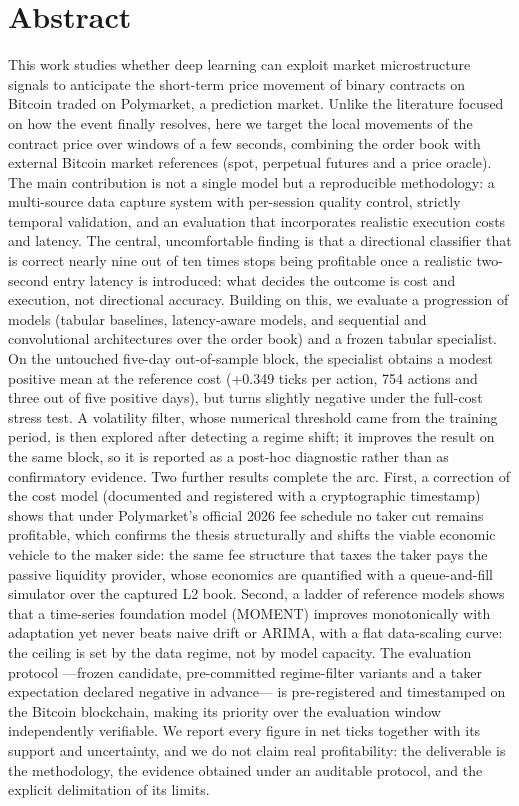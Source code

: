 %

\section*{Abstract}
\label{sec::abstract}

This work studies whether deep learning can exploit market microstructure signals to
anticipate the short-term price movement of binary contracts on Bitcoin traded on
Polymarket, a prediction market. Unlike the literature focused on how the event finally
resolves, here we target the local movements of the contract price over windows of a few
seconds, combining the order book with external Bitcoin market references (spot, perpetual
futures and a price oracle). The main contribution is not a single model but a
reproducible methodology: a multi-source data capture system with per-session quality
control, strictly temporal validation, and an evaluation that incorporates realistic
execution costs and latency. The central, uncomfortable finding is that a directional
classifier that is correct nearly nine out of ten times stops being profitable once a
realistic two-second entry latency is introduced: what decides the outcome is cost and
execution, not directional accuracy. Building on this, we evaluate a progression of models
(tabular baselines, latency-aware models, and sequential and convolutional architectures
over the order book) and a frozen tabular specialist. On the untouched five-day
out-of-sample block, the specialist obtains a modest positive mean at the reference cost
(+0.349 ticks per action, 754 actions and three out of five positive days), but turns
slightly negative under the full-cost stress test. A volatility filter, whose numerical
threshold came from the training period, is then explored after detecting a regime shift;
it improves the result on the same block, so it is reported as a post-hoc diagnostic rather
than as confirmatory evidence. Two further results complete the arc. First, a correction of
the cost model (documented and registered with a cryptographic timestamp) shows that under
Polymarket's official 2026 fee schedule no taker cut remains profitable, which confirms the
thesis structurally and shifts the viable economic vehicle to the maker side: the same fee
structure that taxes the taker pays the passive liquidity provider, whose economics are
quantified with a queue-and-fill simulator over the captured L2 book. Second, a ladder of
reference models shows that a time-series foundation model (MOMENT) improves monotonically
with adaptation yet never beats naive drift or ARIMA, with a flat data-scaling curve: the
ceiling is set by the data regime, not by model capacity. The evaluation protocol —frozen
candidate, pre-committed regime-filter variants and a taker expectation declared negative in advance— is
pre-registered and timestamped on the Bitcoin blockchain, making its priority over the
evaluation window independently verifiable. We report every figure in net ticks together
with its support and uncertainty, and we do not claim real profitability: the deliverable
is the methodology, the evidence obtained under an auditable protocol, and the explicit
delimitation of its limits.

